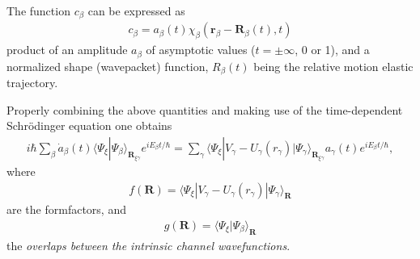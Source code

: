 The function $c_\beta$ can be expressed as
\begin{align}
c_\beta=a_\beta(t)\chi_\beta(\mathbf r_\beta-\mathbf R_\beta(t),t)
\end{align}
product of an amplitude $a_\beta$ of asymptotic values ($t=\pm\infty$, 0 or 1), and a normalized shape (wavepacket) function, $R_\beta(t)$ being the relative motion elastic trajectory.


Properly combining the above quantities and making use of the time-dependent Schr\"odinger equation one obtains 
\begin{align}
i\hbar\sum_{\beta}\dot a_\beta(t)\langle\Psi_\xi|\Psi_\beta\rangle_{\mathbf R_{\xi\gamma}}e^{iE_\beta t/\hbar}=\sum_{\gamma}\langle\Psi_\xi|V_\gamma-U_\gamma(r_\gamma)|\Psi_\gamma\rangle_{\mathbf R_{\xi\gamma}}a_\gamma(t)e^{iE_\beta t/\hbar},
\end{align}
where
\begin{align}
f(\mathbf R)=\langle\Psi_\xi|V_\gamma-U_\gamma(r_\gamma)|\Psi_\gamma\rangle_{\mathbf R}
\end{align}
are the formfactors, and
\begin{align}
g(\mathbf R)=\langle\Psi_\xi|\Psi_\beta\rangle_{\mathbf R}
\end{align}
the \textit{overlaps between the intrinsic channel wavefunctions}.



